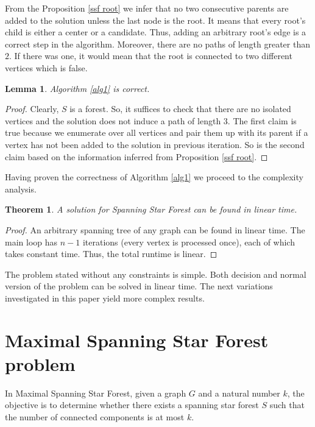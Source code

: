 \documentclass[en]{pracamgr}
\newtheorem{theorem}{Theorem}
\newtheorem{lemma}{Lemma}
\newcommand{\ssf}{spanning star forest}
\newcommand{\ssfp}{{\sc Spanning Star Forest}}
\newcommand{\mssfp}{{\sc Maximal Spanning Star Forest}}
\begin{document}
From the Proposition \ref{ssf root} we infer that no two consecutive parents are added to the solution unless the last node is the root. It means that every root's child is either a center or a candidate. Thus, adding an arbitrary root's edge is a correct step in the algorithm. Moreover, there are no paths of length greater than $2$. If there was one, it would mean that the root is connected to two different vertices which is false.

\begin{lemma}\label{alg1 correctness}
	Algorithm \ref{alg1} is correct.
\end{lemma}

\begin{proof}
	Clearly, $S$ is a forest. So, it suffices to check that there are no isolated vertices and the solution does not induce a path of length $3$. The first claim is true because we enumerate over all vertices and pair them up with its parent if a vertex has not been added to the solution in previous iteration. So is the second claim based on the information inferred from Proposition \ref{ssf root}.
\end{proof}

Having proven the correctness of Algorithm \ref{alg1} we proceed to the complexity analysis.

\begin{theorem}
	A solution for \ssfp{} can be found in linear time.
\end{theorem}

\begin{proof}
	An arbitrary spanning tree of any graph can be found in linear time. The main loop has $n-1$ iterations (every vertex is processed once), each of which takes constant time.
	Thus, the total runtime is linear.
\end{proof}

The problem stated without any constraints is simple. Both decision and normal version of the problem can be solved in linear time. The next variations investigated in this paper yield more complex results.

\section{Maximal Spanning Star Forest problem}

In \mssfp{}, given a graph $G$ and a natural number $k$, the objective is to determine whether there exists a \ssf{} $S$ such that the number of connected components is at most $k$.
\end{document}

